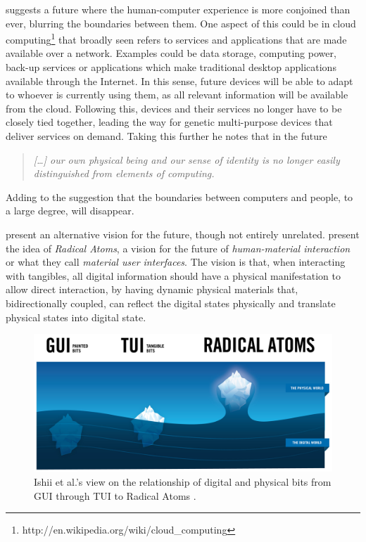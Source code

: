 \citeauthor{abowd2012next} suggests a future where the human-computer experience is more conjoined than ever, blurring the boundaries between them.
One aspect of this could be in cloud computing\footnote{http://en.wikipedia.org/wiki/cloud\_computing} that broadly seen refers to services and applications that are made available over a network.
Examples could be data storage, computing power, back-up services or applications which make traditional desktop applications available through the Internet.
In this sense, future devices will be able to adapt to whoever is currently using them, as all relevant information will be available from the cloud.
Following this, devices and their services no longer have to be closely tied together, leading the way for genetic multi-purpose devices that deliver services on demand.
Taking this further he notes that in the future
\begin{quote}
\emph{[\ldots] our own physical being and our sense of identity is no longer easily distinguished from elements of computing.}
\end{quote}
Adding to the suggestion that the boundaries between computers and people, to a large degree, will disappear.

\citet{ishii2012radical} present an alternative vision for the future, though not entirely unrelated.
\citeauthor{ishii2012radical} present the idea of \textit{Radical Atoms}, a vision for the future of \textit{human-material interaction} or what they call \textit{material user interfaces}.
The vision is that, when interacting with tangibles, all digital information should have a physical manifestation to allow direct interaction, by having dynamic physical materials that, bidirectionally coupled, can reflect the digital states physically and translate physical states into digital state.

\begin{figure}[h]
  \centering
      \includegraphics[width=0.9\linewidth]{figures/radicalatoms}
  \caption{Ishii et al.'s view on the relationship of digital and physical bits from GUI through TUI to Radical Atoms \citep{ishii2012radical}.}
   \label{radicalatoms}
\end{figure}

